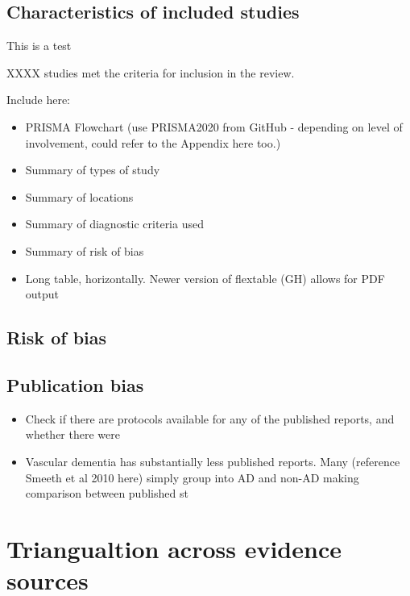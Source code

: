\documentclass[a4paper, twoside]{templates/ociamthesis}
\providecommand{\tightlist}{%
  \setlength{\itemsep}{0pt}\setlength{\parskip}{0pt}}
\begin{document}
\hypertarget{characteristics-of-included-studies}{%
\subsection{Characteristics of included studies}\label{characteristics-of-included-studies}}

\colorbox[HTML]{CCCCFF}{This is a test}

XXXX studies met the criteria for inclusion in the review.

Include here:

\begin{itemize}
\item
  PRISMA Flowchart (use PRISMA2020 from GitHub - depending on level of involvement, could refer to the Appendix here too.)
\item
  Summary of types of study
\item
  Summary of locations
\item
  Summary of diagnostic criteria used
\item
  Summary of risk of bias
\item
  Long table, horizontally. Newer version of flextable (GH) allows for PDF output
\end{itemize}

\hypertarget{risk-of-bias-subheading}{%
\subsection{Risk of bias}\label{risk-of-bias-subheading}}

\hypertarget{publication-bias}{%
\subsection{Publication bias}\label{publication-bias}}

\begin{itemize}
\tightlist
\item
  Check if there are protocols available for any of the published reports, and whether there were
\item
  Vascular dementia has substantially less published reports. Many (reference Smeeth et al 2010 here) simply group into AD and non-AD making comparison between published st
\end{itemize}

\hypertarget{triangualtion-across-evidence-sources}{%
\section{Triangualtion across evidence sources}\label{triangualtion-across-evidence-sources}}
\end{document}
